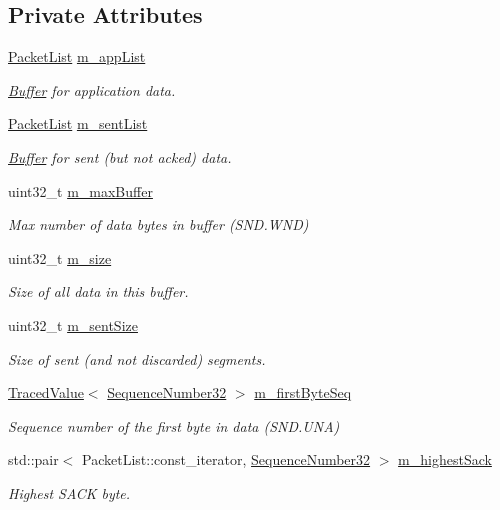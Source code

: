 \subsection*{Private Attributes}
\begin{DoxyCompactItemize}
\item 
\hyperlink{classns3_1_1TcpTxBuffer_a4abe4f4a277dc558fb81c87ca71d5982}{Packet\+List} \hyperlink{classns3_1_1TcpTxBuffer_ac85673c102b50188282a70152cc542ca}{m\+\_\+app\+List}
\begin{DoxyCompactList}\small\item\em \hyperlink{classns3_1_1Buffer}{Buffer} for application data. \end{DoxyCompactList}\item 
\hyperlink{classns3_1_1TcpTxBuffer_a4abe4f4a277dc558fb81c87ca71d5982}{Packet\+List} \hyperlink{classns3_1_1TcpTxBuffer_ae131f4743f4537f3606db664874440e5}{m\+\_\+sent\+List}
\begin{DoxyCompactList}\small\item\em \hyperlink{classns3_1_1Buffer}{Buffer} for sent (but not acked) data. \end{DoxyCompactList}\item 
uint32\+\_\+t \hyperlink{classns3_1_1TcpTxBuffer_a4e661fb54fabfe319c6fc15f7080526f}{m\+\_\+max\+Buffer}
\begin{DoxyCompactList}\small\item\em Max number of data bytes in buffer (S\+N\+D.\+W\+ND) \end{DoxyCompactList}\item 
uint32\+\_\+t \hyperlink{classns3_1_1TcpTxBuffer_ace81d07d65ea00d9609dcc65a926564c}{m\+\_\+size}
\begin{DoxyCompactList}\small\item\em Size of all data in this buffer. \end{DoxyCompactList}\item 
uint32\+\_\+t \hyperlink{classns3_1_1TcpTxBuffer_ae45302ec0a3b3d757b0f3ad85e88e363}{m\+\_\+sent\+Size}
\begin{DoxyCompactList}\small\item\em Size of sent (and not discarded) segments. \end{DoxyCompactList}\item 
\hyperlink{classns3_1_1TracedValue}{Traced\+Value}$<$ \hyperlink{group__network_gacb2070e4e98d2d5135c9bede58f07a03}{Sequence\+Number32} $>$ \hyperlink{classns3_1_1TcpTxBuffer_a46b67e5cb3396b43a41dd3fd5b135346}{m\+\_\+first\+Byte\+Seq}
\begin{DoxyCompactList}\small\item\em Sequence number of the first byte in data (S\+N\+D.\+U\+NA) \end{DoxyCompactList}\item 
std\+::pair$<$ Packet\+List\+::const\+\_\+iterator, \hyperlink{group__network_gacb2070e4e98d2d5135c9bede58f07a03}{Sequence\+Number32} $>$ \hyperlink{classns3_1_1TcpTxBuffer_a224ded405afbf30d8828c8ddd16b29d9}{m\+\_\+highest\+Sack}
\begin{DoxyCompactList}\small\item\em Highest S\+A\+CK byte. \end{DoxyCompactList}\end{DoxyCompactItemize}

